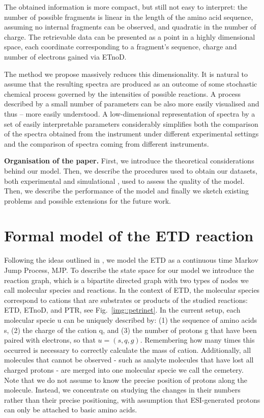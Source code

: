\documentclass{llncs}
\begin{document}
        The obtained information is more compact, but still not easy to interpret: the number of possible fragments is linear in the length of the amino acid sequence, assuming no internal fragments can be observed, and quadratic in the number of charge. The retrievable data can be presented as a point in a highly dimensional space, each coordinate corresponding to a fragment’s sequence, charge and number of electrons gained via ETnoD.

        The method we propose massively reduces this dimensionality. It is natural to assume that the resulting spectra are produced as an outcome of some stochastic chemical process governed by the intensities of possible reactions. A process described by a small number of parameters can be also more easily visualised and thus -- more easily understood. A low-dimensional representation of spectra by a set of easily interpretable parameters considerably simplifies both the comparison of the spectra obtained from the instrument under different experimental settings and the comparison of spectra coming from different instruments.

\textbf{Organisation of the paper.}
        First, we introduce the theoretical considerations behind our model. Then, we describe the procedures used to obtain our datasets, both experimental and  simulational , used to assess the quality of the model. Then, we describe the performance of the model and finally we sketch existing problems and possible extensions for the future work.


\section{Formal model of the ETD reaction}

        Following the ideas outlined in \cite{Gambin2010-lk}, we model the ETD as a continuous time Markov Jump Process, MJP. To describe the state space for our model we introduce the reaction graph, which is a bipartite directed graph with two types of nodes we call molecular species and reactions. In the context of ETD, the molecular species correspond to cations that are substrates or products of the studied reactions: ETD, ETnoD, and PTR, see Fig.~\ref{img::petrinet}. In the current setup, each molecular specie u can be uniquely described by: (1) the sequence of amino acids s, (2) the charge of the cation q, and (3) the number of protons g that have been paired with electrons, so that $u = (s,q,g)$. Remembering how many times this occurred is necessary to correctly calculate the mass of cation.  Additionally, all molecules that cannot be observed - such as analyte molecules that have lost all charged protons - are merged into one molecular specie we call the cemetery. Note that we do not assume to know the precise position of protons along the molecule. Instead, we concentrate on studying the changes in their numbers rather than their precise positioning, with assumption that ESI-generated protons can only be attached to basic amino acids.
\end{document}
